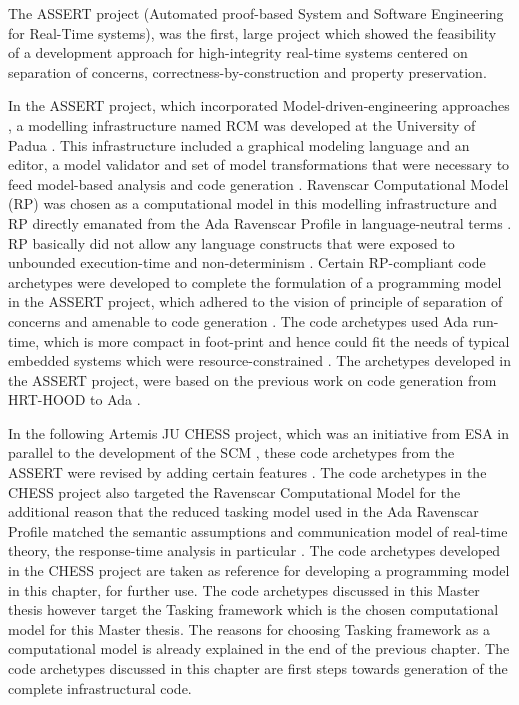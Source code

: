 The ASSERT project (Automated proof-based System and Software Engineering for Real-Time systems), was the first, large project which showed the feasibility of a development approach for high-integrity real-time systems centered on separation of concerns, correctness-by-construction and property preservation.

In the ASSERT project, which incorporated Model-driven-engineering approaches \cite{PhdThesis}, a modelling infrastructure named RCM was developed at the University of Padua \cite{ScheduAnaly}. This infrastructure included a graphical modeling language and an editor, a model validator and set of model transformations that were necessary to feed model-based analysis and code generation \cite{ScheduAnaly}. Ravenscar Computational Model (RP) was chosen as a computational model in this modelling infrastructure and RP directly emanated from the Ada Ravenscar Profile in language-neutral terms \cite{EvoRAVCodeAr}. RP basically did not allow any language constructs that were exposed to unbounded execution-time and non-determinism \cite{CharEvoRAVCodeAr,EvoRAVCodeAr,RAVCodeAr}. Certain RP-compliant code archetypes were developed to complete the formulation of a programming model in the ASSERT project, which adhered to the vision of principle of separation of concerns and amenable to code generation \cite{CharEvoRAVCodeAr}. The code archetypes used Ada run-time, which is more compact in foot-print and hence could fit the needs of typical embedded systems which were resource-constrained \cite{RAVCodeAr}. The archetypes developed in the ASSERT project, were based on the previous work on code generation from HRT-HOOD to Ada \cite{CharEvoRAVCodeAr,EvoRAVCodeAr}.

In the following Artemis JU CHESS project, which was an initiative from ESA in parallel to the development of the SCM \cite{PhdThesis,CompBasedProcess}, these code archetypes from the ASSERT were revised by adding certain features \cite{EvoRAVCodeAr}. The code archetypes in the CHESS project also targeted the Ravenscar Computational Model for the additional reason that the reduced tasking model used in the Ada Ravenscar Profile matched the semantic assumptions and communication model of real-time theory, the response-time analysis in particular \cite{CharEvoRAVCodeAr}. The code archetypes developed in the CHESS project \cite{EvoRAVCodeAr} are taken as reference for developing a programming model in this chapter, for further use. The code archetypes discussed in this Master thesis however target the Tasking framework which is the chosen computational model for this Master thesis. The reasons for choosing Tasking framework as a computational model is already explained in the end of the previous chapter. The code archetypes discussed in this chapter are first steps towards generation of the complete infrastructural code. 

